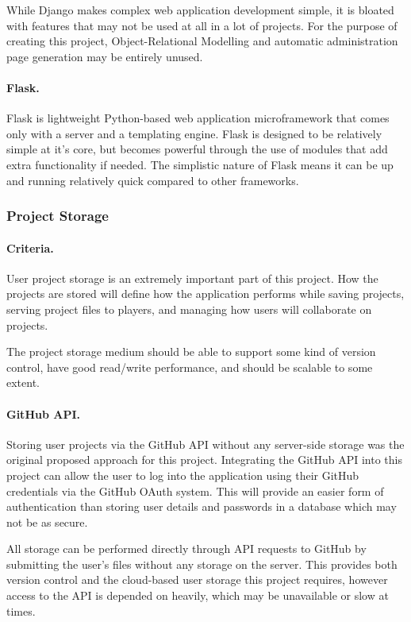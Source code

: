 \documentclass[a4paper, 12pt]{article}
\begin{document}
While Django makes complex web application development simple, it is bloated with features that may not be used at all in a lot of projects. For the purpose of creating this project, Object-Relational Modelling and automatic administration page generation may be entirely unused. 

\paragraph{Flask.}
Flask is lightweight Python-based web application microframework that comes only with a server and a templating engine. Flask is designed to be relatively simple at it's core, but becomes powerful through the use of modules that add extra functionality if needed.\cite{flask} The simplistic nature of Flask means it can be up and running relatively quick compared to other frameworks.

\subsubsection{Project Storage}
\paragraph{Criteria.}
User project storage is an extremely important part of this project. How the projects are stored will define how the application performs while saving projects, serving project files to players, and managing how users will collaborate on projects.

The project storage medium should be able to support some kind of version control, have good read/write performance, and should be scalable to some extent.

\paragraph{GitHub API.}
Storing user projects via the GitHub API without any server-side storage was the original proposed approach for this project.\cite{githubapi} Integrating the GitHub API into this project can allow the user to log into the application using their GitHub credentials via the GitHub OAuth system. \cite{githuboauth} This will provide an easier form of authentication than storing user details and passwords in a database which may not be as secure.

All storage can be performed directly through API requests to GitHub by submitting the user's files without any storage on the server.\cite{githubapicommit} This provides both version control and the cloud-based user storage this project requires, however access to the API is depended on heavily, which may be unavailable or slow at times.
\end{document}
